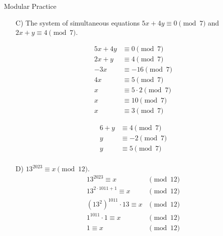 \begin{homeworkProblem}{Modular Practice}
\begin{itemize}
        \item[C)] The system of simultaneous equations $5x+4y \equiv 0 \pmod{7}$ 
        and $2x+y \equiv 4 \pmod{7}$. 
        \begin{multicols}{2}
            \[
                \begin{split}
                    5x + 4y &\equiv 0 \pmod{7} \\
                    2x + y &\equiv 4 \pmod{7} \\
                    -3x &\equiv -16 \pmod{7} \\
                    4x &\equiv 5 \pmod{7} \\
                    x &\equiv 5 \cdot 2 \pmod{7} \\
                    x &\equiv 10 \pmod{7} \\
                    x &\equiv 3 \pmod{7}
                \end{split}
            \]

            \[
                \begin{split}
                    6 + y &\equiv 4 \pmod{7} \\
                    y &\equiv -2 \pmod{7} \\
                    y &\equiv 5 \pmod{7} \\
                \end{split}
            \]
        \end{multicols}

        \item[D)] $13^{2023} \equiv x \pmod{12}$.
        \[
            \begin{split}
                13^{2023} \equiv x & \pmod{12} \\
                13^{2 \cdot 1011 + 1} \equiv x & \pmod{12} \\ 
                (13^2)^{1011} \cdot 13 \equiv x & \pmod{12} \\
                1^{1011} \cdot 1 \equiv x & \pmod{12} \\
                1 \equiv x & \pmod{12}
            \end{split}
        \]


\end{itemize}
\end{homeworkProblem}
